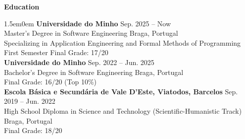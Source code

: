 \noindent\textbf{Education}
\noindent\hrulefill
\vspace{0.25em}
\begin{adjustwidth}{1.5em}{0em}
\textbf{Universidade do Minho} \hfill Sep. 2025 -- Now \\
Master's Degree in Software Engineering \hfill Braga, Portugal \\
Specializing in Application Engineering and Formal Methods of Programming \\
First Semester Final Grade: 17/20
\vspace{0.5em}
\\
\textbf{Universidade do Minho} \hfill Sep. 2022 -- Jun. 2025 \\
Bachelor's Degree in Software Engineering \hfill Braga, Portugal \\
Final Grade: 16/20 (Top 10\%)
\vspace{0.5em}
\\
\textbf{Escola Básica e Secundária de Vale D’Este, Viatodos, Barcelos} \hfill Sep. 2019 -- Jun. 2022 \\
High School Diploma in Science and Technology (Scientific-Humanistic Track) \hfill Braga, Portugal \\
Final Grade: 18/20
\end{adjustwidth}
\vspace{0.25em}